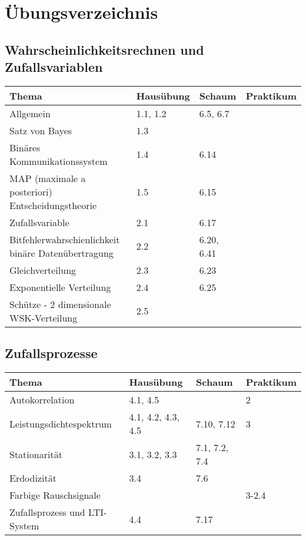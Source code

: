 \section{Übungsverzeichnis}

\subsection{Wahrscheinlichkeitsrechnen und Zufallsvariablen}
	\begin{tabular}{|p{9cm}|p{2.5cm}|p{3.5cm}|p{2cm}|}
	\hline
	\textbf{Thema} & \textbf{Hausübung} & \textbf{Schaum} & \textbf{Praktikum} \\ 
	\hline
	\hline
	Allgemein & 1.1, 1.2 & 6.5, 6.7& \\
	\hline
	Satz von Bayes & 1.3 & & \\
	\hline
	Binäres Kommunikationssystem & 1.4 & 6.14 & \\
	\hline
	MAP (maximale a posteriori) Entscheidungstheorie & 1.5 & 6.15 & \\
	\hline
	Zufallsvariable	& 2.1 & 6.17 &  \\
	\hline
	Bitfehlerwahrschienlichkeit binäre Datenübertragung & 2.2 & 6.20, 6.41 & \\
	\hline
	Gleichverteilung & 2.3 & 6.23 & \\
	\hline
	Exponentielle Verteilung & 2.4 & 6.25 & \\
	\hline
	Schütze - 2 dimensionale WSK-Verteilung & 2.5 & & \\
	\hline
	\end{tabular}
\subsection{Zufallsprozesse}
	\begin{tabular}{|p{9cm}|p{2.5cm}|p{3.5cm}|p{2cm}|}
	\hline
	\textbf{Thema} & \textbf{Hausübung} & \textbf{Schaum} & \textbf{Praktikum} \\ 
	\hline
	Autokorrelation	& 4.1, 4.5 & & 2 \\
	\hline
	Leistungsdichtespektrum & 4.1, 4.2, 4.3, 4.5 & 7.10, 7.12 & 3 \\
	\hline
	Stationarität & 3.1, 3.2, 3.3 & 7.1, 7.2, 7.4& \\
	\hline
	Erdodizität	 & 3.4 & 7.6 & \\
	\hline
	Farbige Rauschsignale & & & 3-2.4\\
	\hline
	Zufallsprozess und LTI-System & 4.4 & 7.17 & \\
	\hline
	\end{tabular}
